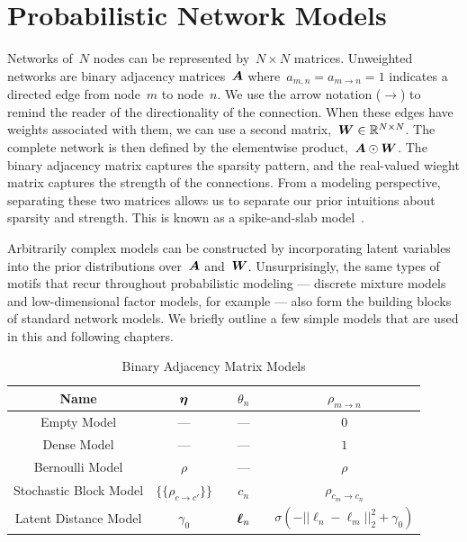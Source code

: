 \section{Probabilistic Network Models}
\label{sec:graph_models}
Networks of~$N$ nodes can be represented by~${N\times N}$
matrices. Unweighted networks are binary adjacency matrices~$\boldsymbol{A}$
where~${a_{m,n}=a_{m \to n}=1}$ indicates a directed edge from
node~$m$ to node~$n$. We use the arrow notation ($\to$) to remind the
reader of the directionality of the connection. When these edges have
weights associated with them, we can use a second matrix,~${\boldsymbol{W} \in
  \mathbb{R}^{N \times N}}$.  The complete network is then defined by the
elementwise product,~${\boldsymbol{A} \odot \boldsymbol{W}}$. The binary adjacency matrix
captures the sparsity pattern, and the real-valued wieght matrix
captures the strength of the connections. From a modeling perspective,
separating these two matrices allows us to separate our prior
intuitions about sparsity and strength. This is known as a
spike-and-slab model~\cite{Mitchell1988, Mohamed-2012}.


Arbitrarily complex models can be constructed by incorporating latent
variables into the prior distributions over~$\boldsymbol{A}$ and~$\boldsymbol{W}$.
Unsurprisingly, the same types of motifs that recur throughout
probabilistic modeling --- discrete mixture models and low-dimensional
factor models, for example --- also form the building blocks of
standard network models.  We briefly outline a few simple models that
are used in this and following chapters.


\begin{table}
\begin{center}
\begin{tabular}{c|c|c|c}
Name & $\boldsymbol{\eta}$ & $\quad\theta_n\quad$ & $\rho_{m \to n}$ \\
\hline
Empty Model & --- &  --- & $0$ \\
Dense Model & --- & --- & $1$ \\
Bernoulli Model & $\rho$ & --- & $\rho$ \\
Stochastic Block Model & $\{\{\rho_{c \to c'}\}\}$ & $c_n$ & $\rho_{c_m \to c_n}$ \\
Latent Distance Model & $\gamma_0$ & $\boldsymbol{\ell}_n$ & $\sigma(-||\ell_n - \ell_m||_2^2 + \gamma_0)$
\end{tabular}
\end{center}
\caption{Binary Adjacency Matrix Models}
\label{tab:A_models}
\end{table}

